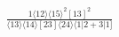 \documentclass[varwidth, border=5pt]{standalone}
\begin{document}
\begin{my}
$\begin{gathered}
\scriptscriptstyle\frac{1⟨12⟩⟨15⟩^2[13]^2}{⟨13⟩⟨14⟩[23]⟨24⟩⟨1|2+3|1]}
\end{gathered}$
\end{my}
\end{document}
